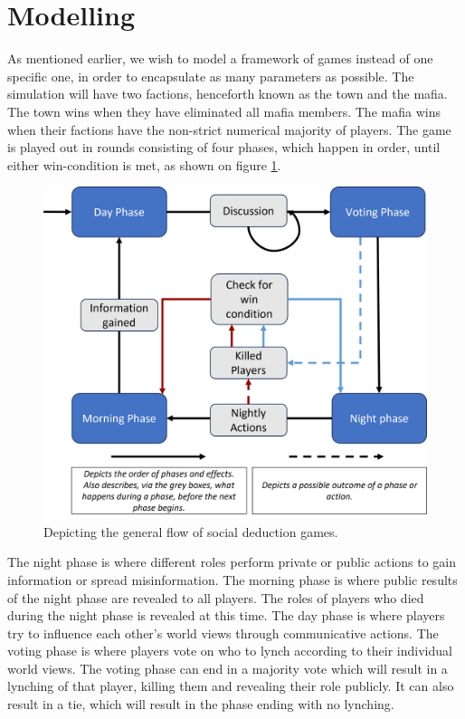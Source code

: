 \section{Modelling}
As mentioned earlier, we wish to model a framework of games instead of one
specific one, in order to encapsulate as many parameters as possible. The
simulation will have two factions, henceforth known as the town and the mafia.
The town wins when they have eliminated all mafia members. The mafia wins when
their factions have the non-strict numerical majority of players. The game is
played out in rounds consisting of four phases, which happen in order, until
either win-condition is met, as shown on figure \ref{fig:GameOverview}.
\begin{figure}[H]
	\includegraphics[width=1\linewidth]{figures/Game_overview}
	\caption{Depicting the general flow of social deduction games.}
	\label{fig:GameOverview}
\end{figure}

The night phase is where different roles perform private or public actions to
gain information or spread misinformation. The morning phase is where public
results of the night phase are revealed to all players. The roles of players
who died during the night phase is revealed at this time. The day phase is
where players try to influence each other's world views through communicative
actions. The voting phase is where players vote on who to lynch according to
their individual world views. The voting phase can end in a majority vote which
will result in a lynching of that player, killing them and revealing their role
publicly. It can also result in a tie, which will result in the phase ending
with no lynching.

